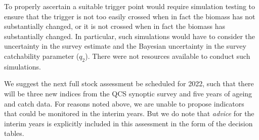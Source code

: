 \documentclass[11pt]{book}
\begin{document}
To properly ascertain a suitable trigger point would require simulation testing to ensure that the trigger is not too easily crossed when in fact the biomass has not substantially changed, or it is not crossed when in fact the biomass has substantially changed. In particular, such simulations would have to consider the uncertainty in the survey estimate and the Bayesian uncertainty in the survey catchability parameter ($q_2$). There were not resources available to conduct such simulations. 

We suggest the next full stock assessment be scheduled for 2022, such that there will be three new indices from the QCS synoptic survey and five years of ageing and catch data. For reasons noted above, we are unable to propose indicators that could be monitored in the interim years. But we do note that \emph{advice} for the interim years is explicitly included in this assessment in the form of the decision tables.



\end{document}
